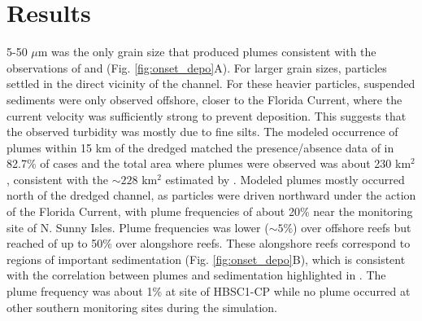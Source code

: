 \documentclass[preprint,12pt,authoryear]{elsarticle}
\begin{document}
\section{Results}

5-50 $\mu$m was the only grain size that produced plumes consistent with the observations of \cite{barnes2015sediment} and \cite{cunning2019extensive} (Fig. \ref{fig:onset_depo}A). For larger grain sizes, particles settled in the direct vicinity of the channel. For these heavier particles, suspended sediments were only observed offshore, closer to the Florida Current, where the current velocity was sufficiently strong to prevent deposition. This suggests that the observed turbidity was mostly due to fine silts. The modeled occurrence of plumes within 15 km of the dredged matched the presence/absence data of \cite{cunning2019extensive} in 82.7\% of cases and the total area where plumes were observed was about 230 km$^2$, consistent with the $\sim228$ km$^2$ estimated by \cite{barnes2015sediment}. Modeled plumes mostly occurred north of the dredged channel, as particles were driven northward under the action of the Florida Current, with plume frequencies of about 20\% near the monitoring site of N. Sunny Isles. Plume frequencies was lower ($\sim 5$\%) over offshore reefs but reached of up to 50\% over alongshore reefs. These alongshore reefs correspond to regions of important sedimentation (Fig. \ref{fig:onset_depo}B), which is consistent with the correlation between plumes and sedimentation highlighted in \cite{cunning2019extensive}. The plume frequency was about 1\% at site of HBSC1-CP while no plume occurred at other southern monitoring sites during the simulation. 

\end{document}
